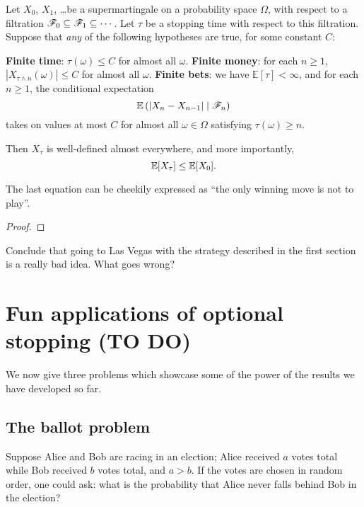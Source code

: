 \begin{theorem}
	Let $X_0$, $X_1$, \dots be a supermartingale on a probability space $\Omega$,
	with respect to a filtration $\mathscr F_0 \subseteq \mathscr F_1 \subseteq \cdots$.
	Let $\tau$ be a stopping time with respect to this filtration.
	Suppose that \emph{any} of the following hypotheses are true,
	for some constant $C$:
	\begin{enumerate}[(a)]
		\ii \textbf{Finite time}: $\tau(\omega) \le C$ for almost all $\omega$.
		\ii \textbf{Finite money}: for each $n \ge 1$,
		$\left\lvert X_{\tau \wedge n}(\omega) \right\rvert \le C$
		for almost all $\omega$.
		\ii \textbf{Finite bets}: we have $\mathbb E[\tau] < \infty$,
		and for each $n \ge 1$, the conditional expectation
		\[ \mathbb E\left( \left\lvert X_n-X_{n-1} \right\rvert
			\mid \mathscr F_n \right) \]
		takes on values at most $C$ for almost all $\omega \in \Omega$
		satisfying $\tau(\omega) \ge n$.
	\end{enumerate}
	Then $X_\tau$ is well-defined almost everywhere,
	and more importantly, \[ \mathbb E[X_\tau] \le \mathbb E[X_0]. \]
\end{theorem}
The last equation can be cheekily expressed as
``the only winning move is not to play''.

\begin{proof}
\end{proof}

\begin{exercise}
	Conclude that going to Las Vegas with the strategy
	described in the first section is a really bad idea.
	What goes wrong?
\end{exercise}

\section{Fun applications of optional stopping (TO DO)}
We now give three problems which showcase some of the power of
the results we have developed so far.

\subsection{The ballot problem}
Suppose Alice and Bob are racing in an election;
Alice received $a$ votes total while Bob received $b$ votes total, and $a > b$.
If the votes are chosen in random order,
one could ask: what is the probability that Alice never falls behind
Bob in the election?

